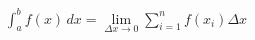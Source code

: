 \documentclass[preview]{standalone}
\begin{document}
\begin{align*}
\int_a^b f(x)\, dx = \lim_{\Delta x \to 0} \sum_{i=1}^n f(x_i) \Delta x
\end{align*}
\end{document}

